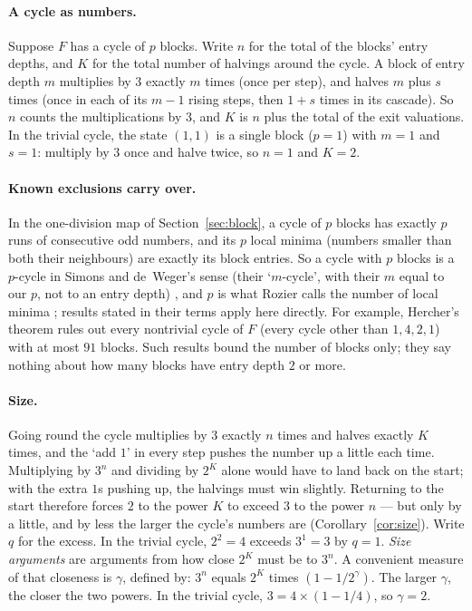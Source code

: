 \documentclass[11pt]{article}
\theoremstyle{remark}
\begin{document}
\paragraph{A cycle as numbers.} Suppose $F$ has a cycle of $p$ blocks. Write $n$ for the total of the blocks' entry depths, and $K$ for the total number of halvings around the cycle. A block of entry depth $m$ multiplies by $3$ exactly $m$ times (once per step), and halves $m$ plus $s$ times (once in each of its $m - 1$ rising steps, then $1 + s$ times in its cascade). So $n$ counts the multiplications by $3$, and $K$ is $n$ plus the total of the exit valuations. In the trivial cycle, the state $(1,1)$ is a single block ($p = 1$) with $m = 1$ and $s = 1$: multiply by $3$ once and halve twice, so $n = 1$ and $K = 2$.

\paragraph{Known exclusions carry over.} In the one-division map of Section~\ref{sec:block}, a cycle of $p$ blocks has exactly $p$ runs of consecutive odd numbers, and its $p$ local minima (numbers smaller than both their neighbours) are exactly its block entries. So a cycle with $p$ blocks is a $p$-cycle in Simons and de~Weger's sense (their `$m$-cycle', with their $m$ equal to our $p$, not to an entry depth) \cite{sdw}, and $p$ is what Rozier calls the number of local minima \cite{rozier91}; results stated in their terms apply here directly. For example, Hercher's theorem \cite{hercher} rules out every nontrivial cycle of $F$ (every cycle other than $1, 4, 2, 1$) with at most $91$ blocks. Such results bound the number of blocks only; they say nothing about how many blocks have entry depth $2$ or more.

\paragraph{Size.} Going round the cycle multiplies by $3$ exactly $n$ times and halves exactly $K$ times, and the `add $1$' in every step pushes the number up a little each time. Multiplying by $3^n$ and dividing by $2^K$ alone would have to land back on the start; with the extra $1$s pushing up, the halvings must win slightly. Returning to the start therefore forces $2$ to the power $K$ to exceed $3$ to the power $n$ --- but only by a little, and by less the larger the cycle's numbers are (Corollary~\ref{cor:size}). Write $q$ for the excess. In the trivial cycle, $2^2 = 4$ exceeds $3^1 = 3$ by $q = 1$. \emph{Size arguments} are arguments from how close $2^K$ must be to $3^n$. A convenient measure of that closeness is $\gamma$, defined by: $3^n$ equals $2^K$ times $(1 - 1/2^{\gamma})$. The larger $\gamma$, the closer the two powers. In the trivial cycle, $3 = 4 \times (1 - 1/4)$, so $\gamma = 2$.
\end{document}
